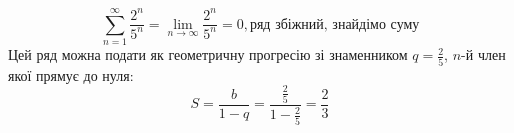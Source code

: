 \documentclass[../rgr_2.tex]{subfiles}
\begin{document}
\Solution

\begin{equation}
	\sum_{n=1}^\infty \frac{2^n}{5^n}
	= \lim_{n\to\infty}\frac{2^n}{5^n}
	= 0, \text{ряд збіжний, знайдімо суму}
\end{equation}
Цей ряд можна подати як геометричну прогресію
зі знаменником $q=\frac{2}{5}$, $n$-й член якої прямує
до нуля:
\begin{equation}
	S=\frac{b}{1-q}=\frac
	{\frac{2}{5}}
	{1-\frac{2}{5}}
	= \frac{2}{3}
\end{equation}

\end{document}
